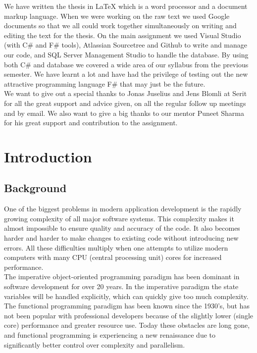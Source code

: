 \documentclass[12pt, a4paper]{article}
\begin{document}
We have written the thesis in LaTeX which is a word processor and a document markup language. When we were working on the raw text we used Google documents so that we all could work together simultaneously on writing and editing the text for the thesis. On the main assignment we used Visual Studio (with C\# and F\# tools), Atlassian Sourcetree and Github to write and manage our code, and SQL Server Management Studio to handle the database. By using both C\# and database we covered a wide area of our syllabus from the previous semester. We have learnt a lot and have had the privilege of testing out the new attractive programming language F\# that may just be the future. \\

We want to give out a special thanks to Jonas Juselius and Jens Blomli at Serit for all the great support and advice given, on all the regular follow up meetings and by email. We also want to give a big thanks to our mentor Puneet Sharma for his great support and contribution to the assignment.\\

\newpage
\tableofcontents

\newpage
\section{Introduction}
\subsection{Background}
One of the biggest problems in modern application development is the rapidly growing complexity of all major software systems. This complexity makes it almost impossible to ensure quality and accuracy of the code. It also becomes harder and harder to make changes to existing code without introducing new errors. All these difficulties multiply when one attempts to utilize modern computers with many CPU (central processing unit) cores for increased performance.\\

The imperative object-oriented programming paradigm has been dominant in software development for over 20 years. In the imperative paradigm the state variables will be handled explicitly, which can quickly give too much complexity. The functional programming paradigm has been known since the 1930’s, but has not been popular with professional developers because of the slightly lower (single core) performance and greater resource use. Today these obstacles are long gone, and functional programming is experiencing a new renaissance due to significantly better control over complexity and parallelism.\\
\end{document}
